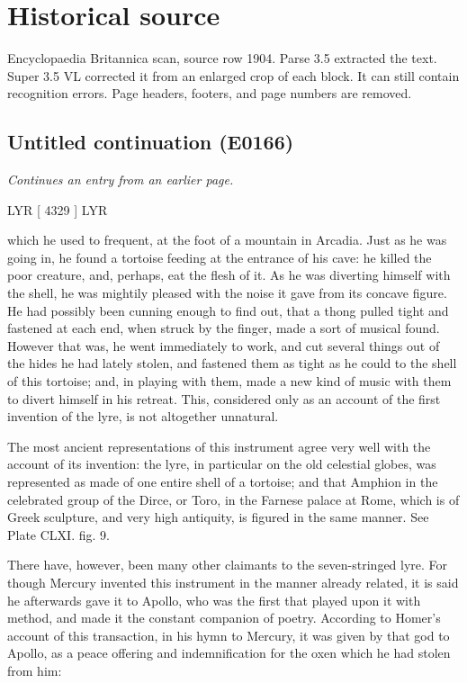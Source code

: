 \documentclass{article}
\begin{document}
\section*{Historical source}
Encyclopaedia Britannica scan, source row 1904. Parse 3.5 extracted the text. Super 3.5 VL corrected it from an enlarged crop of each block. It can still contain recognition errors.
Page headers, footers, and page numbers are removed.

\subsection*{Untitled continuation (E0166)}
\textit{Continues an entry from an earlier page.}

LYR [ 4329 ] LYR

which he used to frequent, at the foot of a mountain in Arcadia. Just as he was going in, he found a tortoise feeding at the entrance of his cave: he killed the poor creature, and, perhaps, eat the flesh of it. As he was diverting himself with the shell, he was mightily pleased with the noise it gave from its concave figure. He had possibly been cunning enough to find out, that a thong pulled tight and fastened at each end, when struck by the finger, made a sort of musical found. However that was, he went immediately to work, and cut several things out of the hides he had lately stolen, and fastened them as tight as he could to the shell of this tortoise; and, in playing with them, made a new kind of music with them to divert himself in his retreat. This, considered only as an account of the first invention of the lyre, is not altogether unnatural.

The most ancient representations of this instrument agree very well with the account of its invention: the lyre, in particular on the old celestial globes, was represented as made of one entire shell of a tortoise; and that Amphion in the celebrated group of the Dirce, or Toro, in the Farnese palace at Rome, which is of Greek sculpture, and very high antiquity, is figured in the same manner. See Plate CLXI. fig. 9.

There have, however, been many other claimants to the seven-stringed lyre. For though Mercury invented this instrument in the manner already related, it is said he afterwards gave it to Apollo, who was the first that played upon it with method, and made it the constant companion of poetry. According to Homer's account of this transaction, in his hymn to Mercury, it was given by that god to Apollo, as a peace offering and indemnification for the oxen which he had stolen from him:
\end{document}

